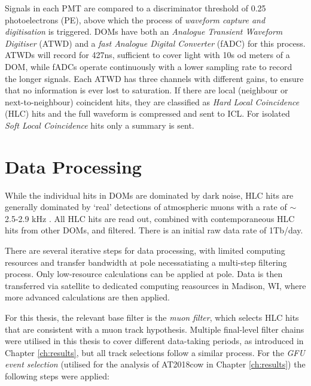 Signals in each PMT are compared to a discriminator threshold of 0.25 photoelectrons (PE), above which the process of \emph{waveform capture and digitisation} is triggered. DOMs have both an \emph{Analogue Transient Waveform Digitiser} (ATWD)  and a \emph{fast Analogue Digital Converter} (fADC) for this process. ATWDs will record for 427ns, sufficient to cover light with 10s od meters of a DOM, while fADCs operate continuously with a lower sampling rate to record the longer signals. Each ATWD has three channels with different gains, to ensure that no information is ever lost to saturation. If there are local (neighbour or next-to-neighbour) coincident hits, they are classified as \emph{Hard Local Coincidence} (HLC) hits and the full waveform is compressed and sent to ICL. For isolated \emph{Soft Local Coincidence} hits only a summary is sent.

\section{Data Processing}

While the individual hits in DOMs are dominated by dark noise, HLC hits are generally dominated by `real' detections of atmospheric muons with a rate of $\sim$2.5-2.9 kHz \cite{icecube_detector_17}. All HLC hits are read out, combined with contemporaneous HLC hits from other DOMs, and filtered. There is an initial raw data rate of 1Tb/day. 

There are several iterative steps for data processing, with limited computing resources and transfer bandwidth at pole necessatiating a multi-step filtering process. Only low-resource calculations can be applied at pole. Data is then transferred via satellite to dedicated computing reasources in Madison, WI, where more advanced calculations are then applied.

For this thesis, the relevant base filter is the \emph{muon filter}, which selects HLC hits that are consistent with a muon track hypothesis. Multiple final-level filter chains were utilised in this thesis to cover different data-taking periods, as introduced in Chapter \ref{ch:results}, but all track selections follow a similar process. For the \emph{GFU event selection} \cite{kintscher_thesis} (utilised for the analysis of AT2018cow in Chapter \ref{ch:results}) the following steps were applied:

